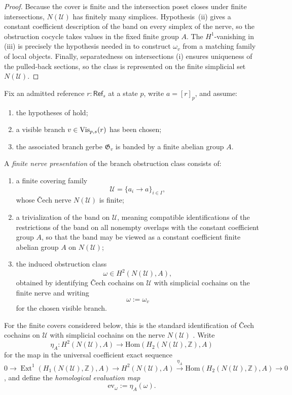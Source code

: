 \begin{proof}
Because the cover is finite and the intersection poset closes under finite intersections, $N(\mathcal U)$ has finitely many simplices. Hypothesis~(ii) gives a constant coefficient description of the band on every simplex of the nerve, so the obstruction cocycle takes values in the fixed finite group $A$. The $H^1$-vanishing in (iii) is precisely the hypothesis needed in  to construct $\omega_v$ from a matching family of local objects. Finally, separatedness on intersections (i) ensures uniqueness of the pulled-back sections, so the class is represented on the finite simplicial set $N(\mathcal U)$.
\end{proof}

\begin{definition}\label{def:finite-nerve-presentation}
Fix an admitted reference $r:\mathsf{Ref}_s$ at a state $p$, write $a=[r]_p$, and assume:
\begin{enumerate}[label=(\roman*),nosep]
\item the hypotheses of  hold;
\item a visible branch $v\in \mathrm{Vis}_{p,s}(r)$ has been chosen;
\item the associated branch gerbe $\mathfrak G_v$ is banded by a finite abelian group $A$.
\end{enumerate}
A \emph{finite nerve presentation} of the branch obstruction class consists of:
\begin{enumerate}[label=(\roman*),nosep]
\item a finite covering family
\[
\mathcal U=\{a_i\to a\}_{i\in I},
\]
whose \v{C}ech nerve $N(\mathcal U)$ is finite;
  \item a trivialization of the band on $\mathcal U$, meaning compatible identifications of the restrictions of the band on all nonempty overlaps with the constant coefficient group $A$, so that the band may be viewed as a constant coefficient finite abelian group $A$ on $N(\mathcal U)$;
\item the induced obstruction class
\[
\omega\in H^2(N(\mathcal U),A),
\]
obtained by identifying \v{C}ech cochains on $\mathcal U$ with simplicial cochains on the finite nerve and writing
\[
\omega:=\omega_v
\]
for the chosen visible branch.
\end{enumerate}
For the finite covers considered below, this is the standard identification of \v{C}ech cochains on $\mathcal U$ with simplicial cochains on the nerve $N(\mathcal U)$ \cite[Secs.~4G, 4K]{Hatcher2002}.
Write
\[
\eta_A:H^2(N(\mathcal U),A)\longrightarrow \mathrm{Hom}(H_2(N(\mathcal U),\mathbb Z),A)
\]
for the map in the universal coefficient exact sequence
\[
0\to \operatorname{Ext}^1(H_1(N(\mathcal U),\mathbb Z),A)\to H^2(N(\mathcal U),A)\xrightarrow{\eta_A}\mathrm{Hom}(H_2(N(\mathcal U),\mathbb Z),A)\to 0
\]
\cite[Sec.~3.1]{Hatcher2002}, and define the \emph{homological evaluation map}
\[
\mathrm{ev}_{\omega}:=\eta_A(\omega).
\]
\end{definition}

